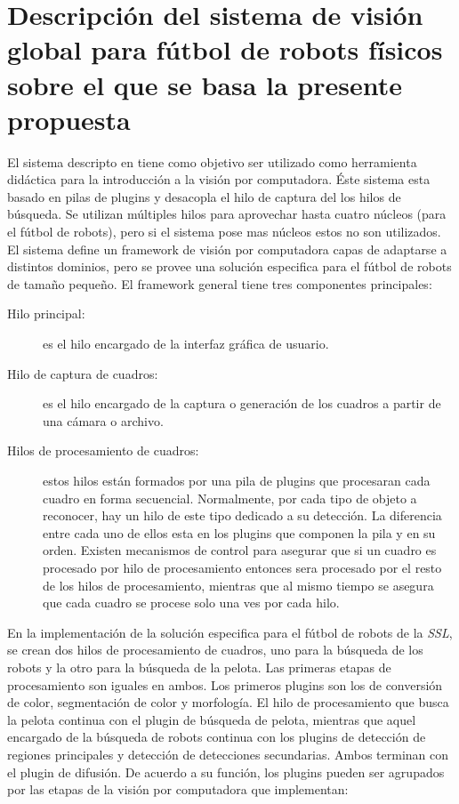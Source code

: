 
\section{Descripción del sistema de visión global para fútbol de robots
físicos sobre el que se basa la presente propuesta}

El sistema descripto en \cite{torres2014} tiene como objetivo ser utilizado como
herramienta didáctica para la introducción a la visión por computadora. Éste
sistema esta basado en pilas de plugins y desacopla el hilo de captura del los
hilos de búsqueda. Se utilizan múltiples hilos para aprovechar hasta cuatro
núcleos (para el fútbol de robots), pero si el sistema pose mas núcleos estos no
son utilizados. El sistema define un framework de visión por computadora capas
de adaptarse a distintos dominios, pero se provee una solución especifica para
el fútbol de robots de tamaño pequeño. El framework general tiene tres
componentes principales:

\begin{description}

	\item[Hilo principal:] es el hilo encargado de la interfaz gráfica de
		usuario.
	
	\item[Hilo de captura de cuadros:] es el hilo encargado de la captura o
		generación de los cuadros a partir de una cámara o archivo.

	\item[Hilos de procesamiento de cuadros:] estos hilos están formados por
		una pila de plugins que procesaran cada cuadro en forma
		secuencial. Normalmente, por cada tipo de objeto a reconocer,
		hay un hilo de este tipo dedicado a su detección. La diferencia
		entre cada uno de ellos esta en los plugins que componen la pila
		y en su orden. Existen mecanismos de control para asegurar que
		si un cuadro es procesado por hilo de procesamiento entonces
		sera procesado por el resto de los hilos de procesamiento,
		mientras que al mismo tiempo se asegura que cada cuadro se
		procese solo una ves por cada hilo.

\end{description}

En la implementación de la solución especifica para el fútbol de robots de la
\emph{SSL}, se crean dos hilos de
procesamiento de cuadros, uno para la búsqueda de los robots y la otro para la
búsqueda de la pelota. Las primeras etapas de procesamiento son iguales en
ambos. Los primeros plugins son los de conversión de color, segmentación de
color y morfología. El hilo de procesamiento que busca la pelota continua con el
plugin de búsqueda de pelota, mientras que aquel encargado de la búsqueda de
robots continua con los plugins de detección de regiones principales y detección
de detecciones secundarias. Ambos terminan con el plugin de difusión. De
acuerdo a su función, los plugins pueden ser agrupados por las etapas de la
visión por computadora que implementan:

